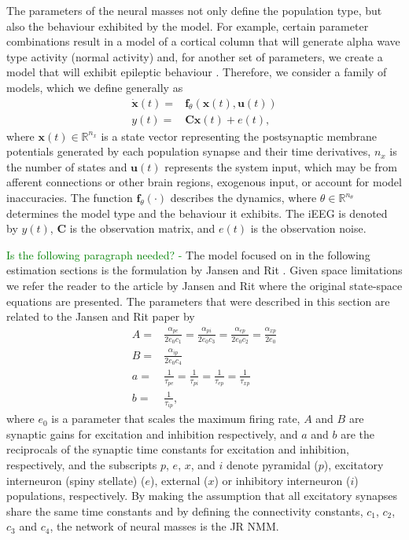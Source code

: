\documentclass{article}
\renewcommand{\vec}[1]{\ensuremath{{\boldsymbol #1}}}
\newcommand{\mat}[1]{\ensuremath{\boldsymbol{#1}}}
\newcommand{\unit}[1]{\textcolor{green}{#1}}
\begin{document}
The parameters of the neural masses not only define the population type, but also the behaviour exhibited by the model. For example, certain parameter combinations result in a model of a cortical column that will generate alpha wave type activity (normal activity) and, for another set of parameters, we create a model that will exhibit epileptic behaviour \cite{Wendling2002}. Therefore, we consider a family of models, which we define generally as 
\begin{align}\label{eq:NeuralMassModel}
    \dot{\vec{x}}(t) =& \vec f_{\theta}\left(\vec{x}(t),\vec{u}(t)\right)\\
    y(t) =& \mat{C}\vec{x}(t) + e(t),
\end{align}
where $\vec{x}(t) \in \mathbb{R}^{n_x}$ is a state vector representing the postsynaptic membrane potentials generated by each population synapse and their time derivatives, $n_x$ is the number of states and $\vec{u}(t)$ represents the system input, which may be from afferent connections or other brain regions, exogenous input, or account for model inaccuracies. The function $\vec f_{\theta}(\cdot)$ describes the dynamics, where $\theta \in \mathbb{R}^{n_{\theta}}$ determines the model type and the behaviour it exhibits. The iEEG is denoted by $y(t)$, $\vec{C}$ is the observation matrix, and $e(t)$ is the observation noise.

\unit{Is the following paragraph needed? -}
The model focused on in the following
estimation sections is the formulation by Jansen and Rit \cite{Jansen-Rit-95}.
Given space limitations we refer the reader to the article by Jansen
and Rit\cite{Jansen-Rit-95} where the original state-space equations
are presented. The parameters that were described in this section are related to the Jansen and Rit paper by
\begin{align}
    A =& \frac{\alpha_{pe}}{2e_0c_1} = \frac{\alpha_{pi}}{2e_0c_3} = \frac{\alpha_{ep}}{2e_0c_2} = \frac{\alpha_{xp}}{2e_0} \\
    B =& \frac{\alpha_{ip}}{2e_0c_4} \\
    a =& \frac{1}{\tau_{pe}} = \frac{1}{\tau_{pi}} = \frac{1}{\tau_{ep}} = \frac{1}{\tau_{xp}} \\
    b =& \frac{1}{\tau_{ip}},
\end{align}
where $e_0$ is a parameter that scales the maximum firing rate, $A$ and $B$ are synaptic gains for excitation and inhibition respectively, and $a$ and $b$ are the reciprocals of the synaptic time constants for excitation and inhibition, respectively, and the subscripts $p$, $e$, $x$, and $i$ denote pyramidal ($p$), excitatory interneuron (spiny stellate) ($e$), external ($x$) or inhibitory interneuron ($i$) populations, respectively. By making the assumption that all excitatory synapses share the same time constants and by defining the connectivity constants, $c_1$, $c_2$, $c_3$ and $c_4$, the network of neural masses is the JR NMM.
\end{document}
